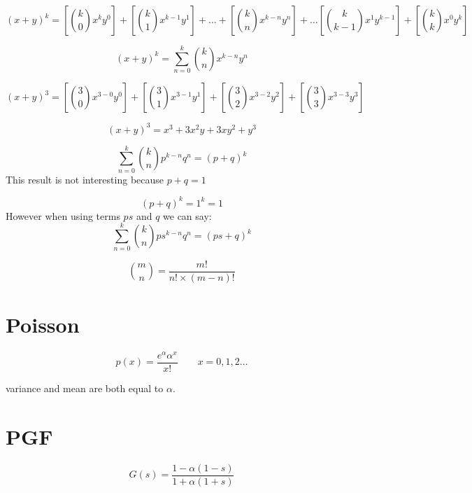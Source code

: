 \[
(x + y)^k = [{k \choose 0}x^{k}y^{0}] + [{k \choose
	1}x^{k-1}y^{1}] +  \dots + [{k \choose n}x^{k-n}y^{n}] + \dots [{k
	\choose k-1}x^{1}y^{k-1}] + [ {k \choose k}x^{0}y^{k}]
\]

\[
(x + y)^k = \sum_{n=0}^{k} {k \choose n}x^{k-n}y^{n}
\]

\[
(x + y)^3 = \left[{3 \choose 0}x^{3-0}y^{0}\right] + \left[{3
	\choose 1}x^{3-1}y^{1}\right] +  \left[ {3 \choose
	2}x^{3-2}y^{2}\right] + \left[ {3 \choose 3}x^{3-3}y^{3}\right]
\]

\[
(x + y)^3 = x^{3} + 3x^2y + 3xy^2 + y^{3}
\]


\[
\sum_{n=0}^{k} {k \choose n}p^{k-n}q^{n} = (p + q)^k
\]
This result is not interesting because $p+q=1$

\[
(p + q)^k = 1^{k} = 1
\]
However when using terms $ps$ and $q$ we can say:
\[
\sum_{n=0}^{k} {k \choose n}ps^{k-n}q^{n} = (ps + q)^k
\]


\[
{m \choose n}  = \frac{m!}{n! \times (m-n)!} \]

\section{Poisson}

\[ p(x) = \frac{e^{\alpha}\alpha^{x}}{x!} \qquad x = 0, 1,2 \dots
\]

variance and mean are both equal to $\alpha$.

\section{PGF}

\[
G(s) = \frac{1-\alpha(1-s)}{1+\alpha(1+s)}
\]



